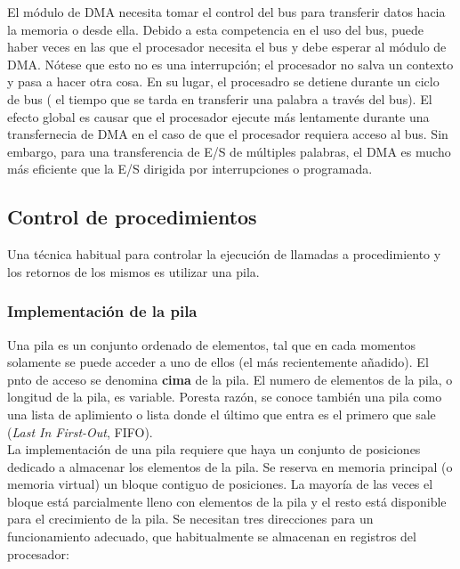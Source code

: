 \documentclass{article}
\begin{document}
							El módulo de DMA necesita tomar el control del bus para transferir datos hacia la memoria o desde ella. Debido a esta competencia en el uso del bus, puede haber veces en las que el procesador necesita el bus y debe esperar al módulo de DMA. Nótese que esto no es una interrupción; el procesador no salva un contexto y pasa a hacer otra cosa. En su lugar, el procesadro se detiene durante un ciclo de bus ( el tiempo que se tarda en transferir una palabra a través del bus). El efecto global es causar que el procesador ejecute más lentamente durante una transfernecia de DMA en el caso de que el procesador requiera acceso al bus. Sin embargo, para una transferencia de E/S de múltiples palabras, el DMA es mucho más eficiente que la E/S dirigida por interrupciones o programada.
							
		
					\subsection{Control de procedimientos} \label{Control de procedimientos}
						Una técnica habitual para controlar la ejecución de llamadas a procedimiento y los retornos de los mismos es utilizar una pila. 
						
						\subsubsection{Implementación de la pila}
							Una pila es un conjunto ordenado de elementos, tal que en cada momentos solamente se puede acceder a uno de ellos (el más recientemente añadido). El pnto de acceso se denomina \textbf{cima} de la pila. El numero de elementos de la pila, o longitud de la pila, es variable. Poresta razón, se conoce también una pila como una lista de aplimiento o lista donde el último que entra es el primero que sale (\textit{Last In First-Out}, FIFO). \\
							
							La implementación de una pila requiere que haya un conjunto de posiciones dedicado a almacenar los elementos de la pila. Se reserva en memoria principal (o memoria virtual) un bloque contiguo de posiciones. La mayoría de las veces el bloque está parcialmente lleno con elementos de la pila y el resto está disponible para el crecimiento de la pila. Se necesitan tres direcciones para un funcionamiento adecuado, que habitualmente se almacenan en registros del procesador:
							
\end{document}
